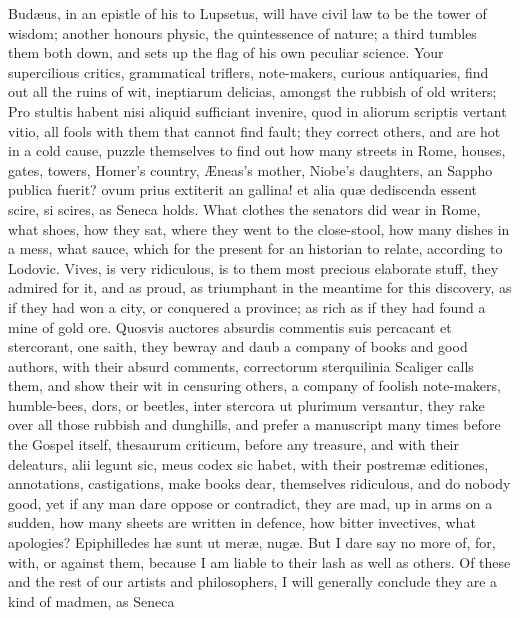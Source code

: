 {Bud\ae{}us, in an epistle of his to Lupsetus, will have civil law to be
the tower of wisdom; another honours physic, the quintessence of
nature; a third tumbles them both down, and sets up the flag of his own
peculiar science. Your supercilious critics, grammatical triflers,
note-makers, curious antiquaries, find out all the ruins of wit,
ineptiarum delicias, amongst the rubbish of old writers; Pro
stultis habent nisi aliquid sufficiant invenire, quod in aliorum
scriptis vertant vitio, all fools with them that cannot find fault;
they correct others, and are hot in a cold cause, puzzle themselves to
find out how many streets in Rome, houses, gates, towers, Homer's
country, \AE{}neas's mother, Niobe's daughters, an Sappho publica fuerit?
ovum prius extiterit an gallina! \etc{} et alia qu\ae{} dediscenda
essent scire, si scires, as Seneca holds. What clothes the
senators did wear in Rome, what shoes, how they sat, where they went to
the close-stool, how many dishes in a mess, what sauce, which for the
present for an historian to relate, according to Lodovic. Vives,
is very ridiculous, is to them most precious elaborate stuff, they
admired for it, and as proud, as triumphant in the meantime for this
discovery, as if they had won a city, or conquered a province; as rich
as if they had found a mine of gold ore. Quosvis auctores absurdis
commentis suis percacant et stercorant, one saith, they bewray and daub
a company of books and good authors, with their absurd comments,
correctorum sterquilinia Scaliger calls them, and show their wit
in censuring others, a company of foolish note-makers, humble-bees,
dors, or beetles, inter stercora ut plurimum versantur, they rake over
all those rubbish and dunghills, and prefer a manuscript many times
before the Gospel itself, thesaurum criticum, before any treasure,
and with their deleaturs, alii legunt sic, meus codex sic habet, with
their postrem\ae{} editiones, annotations, castigations, \etc{} make books
dear, themselves ridiculous, and do nobody good, yet if any man dare
oppose or contradict, they are mad, up in arms on a sudden, how many
sheets are written in defence, how bitter invectives, what apologies?
Epiphilledes h\ae{} sunt ut mer\ae{}, nug\ae{}. But I dare say no more of,
for, with, or against them, because I am liable to their lash as well
as others. Of these and the rest of our artists and philosophers, I
will generally conclude they are a kind of madmen, as  Seneca
}
